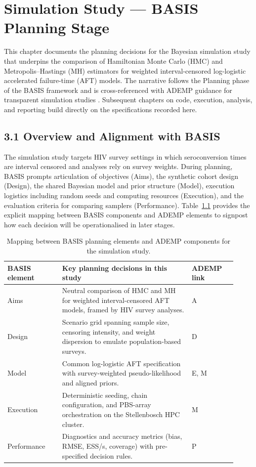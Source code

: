 \chapter{Simulation Study — BASIS Planning Stage}
\label{chap:sim-plan}

This chapter documents the planning decisions for the Bayesian simulation study that underpins the comparison of Hamiltonian Monte Carlo (HMC) and Metropolis–Hastings (MH) estimators for weighted interval-censored log-logistic accelerated failure-time (AFT) models. The narrative follows the Planning phase of the BASIS framework \citep{Kelter2023BASIS} and is cross-referenced with ADEMP guidance for transparent simulation studies \citep{Morris2019Simulation}. Subsequent chapters on code, execution, analysis, and reporting build directly on the specifications recorded here.

\section{3.1 Overview and Alignment with BASIS}
\label{sec:basis-overview}
The simulation study targets HIV survey settings in which seroconversion times are interval censored and analyses rely on survey weights. During planning, BASIS prompts articulation of objectives (Aims), the synthetic cohort design (Design), the shared Bayesian model and prior structure (Model), execution logistics including random seeds and computing resources (Execution), and the evaluation criteria for comparing samplers (Performance). Table~\ref{tab:basis-mapping} provides the explicit mapping between BASIS components and ADEMP elements to signpost how each decision will be operationalised in later stages.

\begin{table}[htbp]
\centering
\caption{Mapping between BASIS planning elements and ADEMP components for the simulation study.}
\label{tab:basis-mapping}
\begin{tabular}{p{0.22\linewidth}p{0.52\linewidth}p{0.18\linewidth}}
\toprule
{BASIS element} & {Key planning decisions in this study} & {ADEMP link} \\
\midrule
Aims & Neutral comparison of HMC and MH for weighted interval-censored AFT models, framed by HIV survey analyses. & A \\
Design & Scenario grid spanning sample size, censoring intensity, and weight dispersion to emulate population-based surveys. & D \\
Model & Common log-logistic AFT specification with survey-weighted pseudo-likelihood and aligned priors. & E, M \\
Execution & Deterministic seeding, chain configuration, and PBS-array orchestration on the Stellenbosch HPC cluster. & M \\
Performance & Diagnostics and accuracy metrics (bias, RMSE, ESS/s, coverage) with pre-specified decision rules. & P \\
\bottomrule
\end{tabular}
\end{table}

